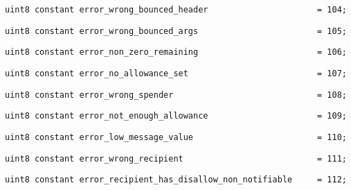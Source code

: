 \begin{lstlisting}[firstnumber=8]
    uint8 constant error_wrong_bounced_header                      = 104;
\end{lstlisting}

\begin{lstlisting}[firstnumber=9]
    uint8 constant error_wrong_bounced_args                        = 105;
\end{lstlisting}

\begin{lstlisting}[firstnumber=10]
    uint8 constant error_non_zero_remaining                        = 106;
\end{lstlisting}

\begin{lstlisting}[firstnumber=11]
    uint8 constant error_no_allowance_set                          = 107;
\end{lstlisting}

\begin{lstlisting}[firstnumber=12]
    uint8 constant error_wrong_spender                             = 108;
\end{lstlisting}

\begin{lstlisting}[firstnumber=13]
    uint8 constant error_not_enough_allowance                      = 109;
\end{lstlisting}

\begin{lstlisting}[firstnumber=14]
    uint8 constant error_low_message_value                         = 110;
\end{lstlisting}

\begin{lstlisting}[firstnumber=15]
    uint8 constant error_wrong_recipient                           = 111;
\end{lstlisting}

\begin{lstlisting}[firstnumber=16]
    uint8 constant error_recipient_has_disallow_non_notifiable     = 112;
\end{lstlisting}
